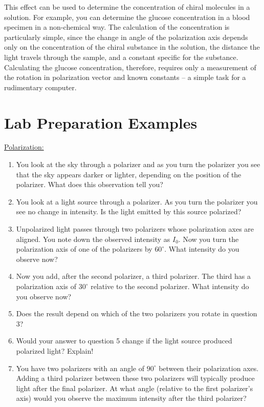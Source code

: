 This effect can be used to determine the concentration of chiral molecules in a solution. For example, you can determine the glucose concentration in a blood specimen in a non-chemical way. The calculation of the concentration is particularly simple, since the change in angle of the polarization axis depends only on the concentration of the chiral substance in the solution, the distance the light travels through the sample, and a constant specific for the substance. Calculating the glucose concentration, therefore, requires only a measurement of the rotation in polarization vector and known constants -- a simple task for a rudimentary computer.

\newpage
\section{Lab Preparation Examples}
\underline{Polarization:}
\begin{enumerate}
\item You look at the sky through a polarizer and as you turn the polarizer you see that the sky appears darker or lighter, depending on the position of the polarizer. What does this observation tell you?

\item You look at a light source through a polarizer. As you turn the polarizer you see no change in intensity. Is the light emitted by this source polarized?

\item Unpolarized light passes through two polarizers whose polarization axes are aligned. You note down the observed intensity as $I_{0}$. Now you turn the polarization axis of one of the polarizers by $60^{\circ}$. What intensity do you observe now?

\item Now you add, after the second polarizer, a third polarizer. The third has a polarization axis of $30^{\circ}$ relative to the second polarizer. What intensity do you observe now?

\item Does the result depend on which of the two polarizers you rotate in question 3?

\item Would your answer to question 5 change if the light source produced polarized light? Explain!

\item You have two polarizers with an angle of $90^{\circ}$ between their polarization axes. Adding a third polarizer between these two polarizers will typically produce light after the final polarizer. At what angle (relative to the first polarizer's axis) would you observe the maximum intensity after the third polarizer?
\end{enumerate}

